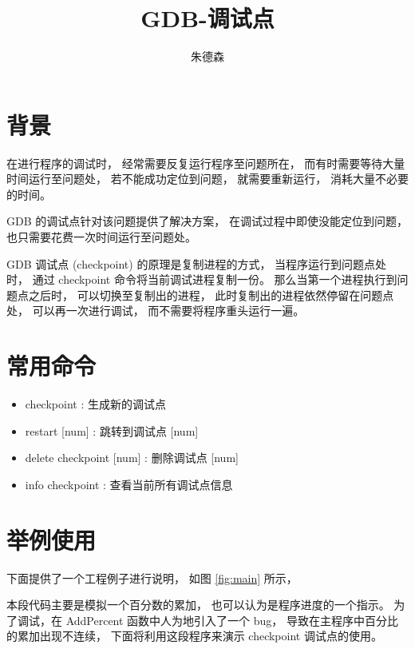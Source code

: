 \documentclass[UTF8]{article}   %
\author{朱德森}
\title{GDB-调试点}
\begin{document}
\songti
\linespread{1.3}
\maketitle
\tableofcontents
\newpage

\section{背景}
在进行程序的调试时，
经常需要反复运行程序至问题所在，
而有时需要等待大量时间运行至问题处，
若不能成功定位到问题，
就需要重新运行，
消耗大量不必要的时间。

GDB 的调试点针对该问题提供了解决方案，
在调试过程中即使没能定位到问题，
也只需要花费一次时间运行至问题处。

GDB 调试点 (checkpoint) 的原理是复制进程的方式，
当程序运行到问题点处时，
通过 checkpoint 命令将当前调试进程复制一份。
那么当第一个进程执行到问题点之后时，
可以切换至复制出的进程，
此时复制出的进程依然停留在问题点处，
可以再一次进行调试，
而不需要将程序重头运行一遍。

\section{常用命令}
\begin{itemize}
    \item checkpoint              : 生成新的调试点
    \item restart [num]           : 跳转到调试点 [num]
    \item delete checkpoint [num] : 删除调试点 [num]
    \item info checkpoint         : 查看当前所有调试点信息
\end{itemize}

\section{举例使用}
下面提供了一个工程例子进行说明，
如图 \ref{fig:main} 所示，

本段代码主要是模拟一个百分数的累加，
也可以认为是程序进度的一个指示。
为了调试，在 AddPercent 函数中人为地引入了一个 bug，
导致在主程序中百分比的累加出现不连续，
下面将利用这段程序来演示 checkpoint 调试点的使用。
\end{document}
